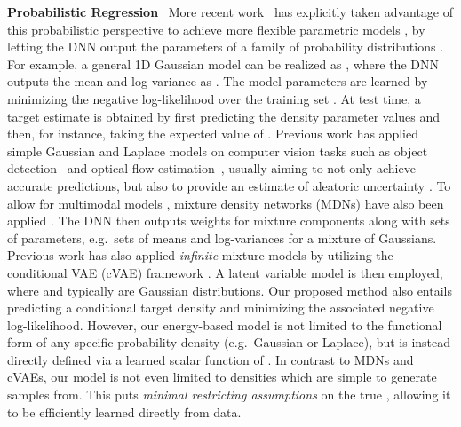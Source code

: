 \documentclass[runningheads]{llncs}
\newcommand{\parsection}[1]{\noindent\textbf{#1}~ }
\begin{document}
\parsection{Probabilistic Regression}
More recent work~\cite{kendall2017uncertainties,lakshminarayanan2017simple,chua2018deep,gast2018lightweight,ilg2018uncertainty,makansi2019overcoming,varamesh2020mixture} has explicitly taken advantage of this probabilistic perspective to achieve more flexible parametric models , by letting the DNN output the parameters  of a family of probability distributions . For example, a general 1D Gaussian model can be realized as , where the DNN outputs the mean and log-variance as . The model parameters  are learned by minimizing the negative log-likelihood  over the training set . At test time, a target estimate  is obtained by first predicting the density parameter values  and then, for instance, taking the expected value of . Previous work has applied simple Gaussian and Laplace models on computer vision tasks such as object detection~\cite{feng2019leveraging,he2019bounding} and optical flow estimation~\cite{gast2018lightweight,ilg2018uncertainty}, usually aiming to not only achieve accurate predictions, but also to provide an estimate of aleatoric uncertainty \cite{kendall2017uncertainties,gustafsson2020evaluating}. To allow for multimodal models , mixture density networks (MDNs) \cite{bishop1994mixture} have also been applied \cite{makansi2019overcoming,varamesh2020mixture}. The DNN then outputs weights for  mixture components along with  sets of parameters, e.g.\  sets of means and log-variances for a mixture of Gaussians. Previous work has also applied \emph{infinite} mixture models by utilizing the conditional VAE (cVAE) framework \cite{sohn2015learning,prokudin2018deep}. A latent variable model  is then employed, where  and  typically are Gaussian distributions. Our proposed method also entails predicting a conditional target density  and minimizing the associated negative log-likelihood. However, our energy-based model  is not limited to the functional form of any specific probability density (e.g.\ Gaussian or Laplace), but is instead directly defined via a learned scalar function of . In contrast to MDNs and cVAEs, our model  is not even limited to densities which are simple to generate samples from. This puts \emph{minimal restricting assumptions} on the true , allowing it to be efficiently learned directly from data. 
\end{document}

